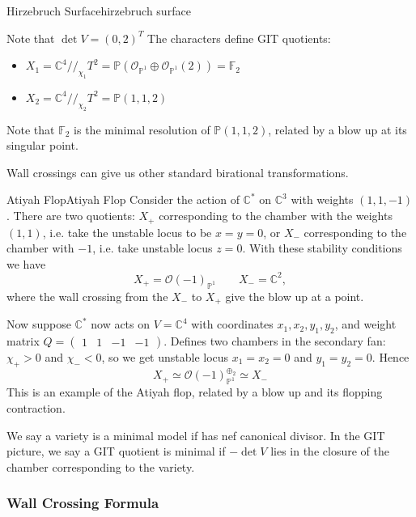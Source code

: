 \begin{example}{Hirzebruch Surface}{hirzebruch surface}
\begin{centering}
\begin{tikzpicture}[x=0.75pt,y=0.75pt,yscale=-1,xscale=1]
\end{tikzpicture}
	
\end{centering}

Note that $\det V=(0,2)^T$
The characters define GIT quotients: 
\begin{itemize}
	\item  $X_{1}= \mathbb{C}^{4}//_{\chi_{1}}T^{2}= \mathbb{P}(\mathcal{O}_{\mathbb{P}^{1}}\oplus \mathcal{O}_{\mathbb{P}^{1}}(2)) = \mathbb{F}_2$
	\item  $X_{2}= \mathbb{C}^{4}//_{\chi_{2}}T^{2}= \mathbb{P}(1,1,2)$
\end{itemize}

Note that $\mathbb{F}_2$ is the minimal resolution of $\mathbb{P}(1,1,2)$, related by a blow up at its singular point.
\end{example}

Wall crossings can give us other standard birational transformations.

\begin{example}{Atiyah Flop}{Atiyah Flop}
Consider the action of $\mathbb{C}^{*}$ on $\mathbb{C}^3$ with weights $(1,1,-1)$. 
There are two quotients: $X_+$ corresponding to the chamber with the weights $(1,1)$, i.e. take the unstable locus to be $x=y= 0$, or $X_-$ corresponding to the chamber with $-1$, i.e. take unstable locus $z = 0$. With these stability conditions we have $$
X_{+}= \mathcal{O}(-1)_{\mathbb{P}^{1}} \qquad X_{-}= \mathbb{C}^2, $$ where the wall crossing from the $X_-$ to $X_+$ give the blow up at a point. 

Now suppose $\mathbb{C}^*$ now acts on $V = \mathbb{C}^4$  with coordinates $x_{1}, x_{2}, y_{1},y_{2}$, and weight matrix $Q = \begin{pmatrix}1&1&-1&-1\end{pmatrix}$. 
Defines two chambers in the secondary fan: $\chi_{+}>0$ and $\chi_{-}<0$, so we get unstable locus $x_{1}= x_{2}= 0$ and $y_{1}= y_{2}=0$. Hence $$
X_{+}\simeq \mathcal{O}(-1)_{\mathbb{P}^{1}}^{\oplus_{2}}\simeq X_-
$$This is an example of the Atiyah flop, related by a blow up and its flopping contraction. 
\end{example}

We say a variety is a minimal model if has nef canonical divisor. In the GIT picture, we say a GIT quotient is minimal if $-\det V$ lies in the closure of the chamber corresponding to the variety. 

\subsubsection{Wall Crossing Formula}

